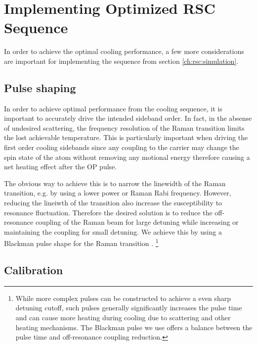 \section{Implementing Optimized RSC Sequence}
\label{ch:rsc:implementation}

In order to achieve the optimal cooling performance, a few more considerations are important
for implementing the sequence from section \ref{ch:rsc:simulation}.

\subsection{Pulse shaping}
\label{ch:rsc:implementation:pulse-shaping}

In order to achieve optimal performance from the cooling sequence,
it is important to accurately drive the intended sideband order.
In fact, in the absense of undesired scattering,
the frequency resolution of the Raman transition limits the lost achievable temperature.
This is particularly important when driving the first order cooling sidebands
since any coupling to the carrier may change the spin state of the atom without
removing any motional energy therefore causing a net heating effect after the OP pulse.

The obvious way to achieve this is to narrow the linewidth of the Raman transition,
e.g. by using a lower power or Raman Rabi frequency.
However, reducing the lineiwth of the transition also increase the susceptibility
to resonance fluctuation.
Therefore the desired solution is to reduce the off-resonance coupling of the Raman beam
for large detuning while increasing or maintaining the coupling for small detuning.
We achieve this by using a Blackman pulse shape for the Raman transition
\cite{kasevich_laser_1992}.
\footnote{While more complex pulses can be constructed to achieve a even sharp detuning cutoff,
  \todo{\cite{}} such pulses generally significantly increases the pulse time
  and can cause more heating during cooling due to scattering and other heating mechanisms.
  The Blackman pulse we use offers a balance between the pulse time
  and off-resonance coupling reduction.}

\subsection{Calibration}

